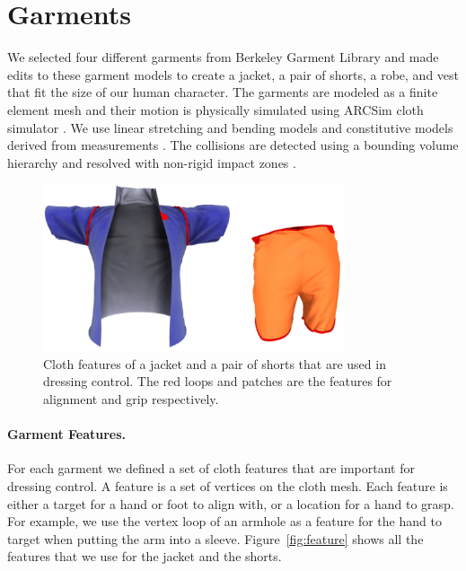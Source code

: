 \section{Garments}

We selected four different garments from Berkeley Garment Library and made
edits to these garment models to create a jacket, a pair of
shorts, a robe, and vest that fit the size of our human character. The
garments are modeled as a finite element mesh and their motion is
physically simulated
using ARCSim cloth simulator \cite{Narain:2012:AAR}. We use linear
stretching and bending models and constitutive models derived from
measurements \cite{Wang:2011}. The collisions are detected using a
bounding volume hierarchy \cite{Tang:2010} and resolved with non-rigid
impact zones \cite{Harmon:2008}.

\begin{figure}[!t]
  \centering
  \includegraphics[width=3.5in]{images/features}
  \caption{Cloth features of a jacket and a pair of shorts that are used in dressing control. The red loops and patches are the features for alignment and grip respectively.}
  \label{fig:features}
\end{figure}


\paragraph{Garment Features.} For each garment we defined a set of cloth
features that are important for dressing control. A feature is a set of
vertices on the cloth mesh.  Each feature is either a target for a hand or
foot to align with, or a location for a hand to grasp.  For example, we
use the vertex loop of an armhole as a feature for the hand to target when
putting the arm into a sleeve.  Figure~\ref{fig:feature} shows all the
features that we use for the jacket and the shorts.
